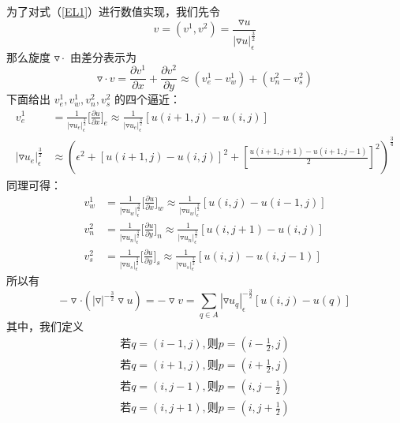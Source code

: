 为了对式（\ref{EL1}）进行数值实现，我们先令
\[v=(v^1,v^2)=\frac{\triangledown u}{|\triangledown u|_{\epsilon}^{\frac{3}{2}}}\]
那么旋度 $\triangledown \cdot$ 由差分表示为
\begin{equation}
\triangledown \cdot v=\frac{\partial v^1}{\partial x}+\frac{\partial v^2}{\partial y} \approx (v_e^1-v_w^1)+(v_n^2-v_s^2)
\end{equation}
下面给出 $v_e^1,v_w^1,v_n^2,v_s^2$ 的四个逼近：
\begin{align*}
v_e^1&=\frac{1}{|\triangledown u_e|_\epsilon^{\frac{3}{2}}}\Big[\frac{\partial u}{\partial x}\Big]_e \approx \frac{1}{|\triangledown u_e|_\epsilon^{\frac{3}{2}}} [u(i+1,j)-u(i,j)] \\
|\triangledown u_e|_\epsilon^{\frac{3}{2}}& \approx (\epsilon^2+[u(i+1,j)-u(i,j)]^2+[\frac{u(i+1,j+1)-u(i+1,j-1)}{2}]^2)^{\frac{3}{4}}
\end{align*}
同理可得：
\begin{align*}
v_w^1&=\frac{1}{|\triangledown u_w|_\epsilon^{\frac{3}{2}}}\Big[\frac{\partial u}{\partial x}\Big]_w \approx \frac{1}{|\triangledown u_w|_\epsilon^{\frac{3}{2}}} [u(i,j)-u(i-1,j)] \\
v_n^2&=\frac{1}{|\triangledown u_n|_\epsilon^{\frac{3}{2}}}\Big[\frac{\partial u}{\partial y}\Big]_n \approx \frac{1}{|\triangledown u_n|_\epsilon^{\frac{3}{2}}} [u(i,j+1)-u(i,j)] \\
v_s^2&=\frac{1}{|\triangledown u_s|_\epsilon^{\frac{3}{2}}}\Big[\frac{\partial u}{\partial y}\Big]_s \approx \frac{1}{|\triangledown u_s|_\epsilon^{\frac{3}{2}}} [u(i,j)-u(i,j-1)]
\end{align*}
所以有
\begin{equation}
-\triangledown \cdot (|\triangledown|^{-\frac{3}{2}} \triangledown u)=-\triangledown v=\sum_{q \in A}|\triangledown u_q|_\epsilon^{-\frac{3}{2}}[u(i,j)-u(q)]
\end{equation}
其中，我们定义
\begin{align}
\text{若}  q=(i-1,j),\text{则} p=(i-\frac{1}{2},j) \\
\text{若}  q=(i+1,j),\text{则} p=(i+\frac{1}{2},j) \\
\text{若}  q=(i,j-1),\text{则} p=(i,j-\frac{1}{2}) \\
\text{若}  q=(i,j+1),\text{则}  p=(i,j+\frac{1}{2})
\end{align}

